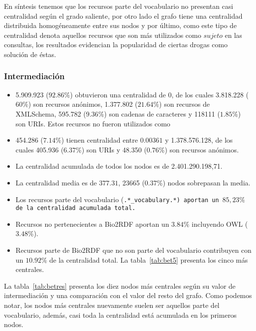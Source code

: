 En síntesis tenemos que los recursos parte del vocabulario no presentan casi
centralidad según el grado saliente, por otro lado el grafo tiene una
centralidad distribuida homogéneamente entre sus nodos y por último, como este
tipo de centralidad denota aquellos recursos que son más utilizados como
$sujeto$ en las consultas, los resultados evidencian la popularidad de ciertas
drogas como solución de éstas.

\subsubsection{Intermediación}
\begin{itemize}
  \item 5.909.923 ($92.86\%$) obtuvieron una centralidad de 0, de los cuales
      3.818.228 ($60\%$) son recursos anónimos,
      1.377.802 ($21.64\%$) son recursos de XMLSchema,
      595.782 ($9.36\%$) son cadenas de caracteres y
      118111 ($1.85\%$) son URIs.
      Estos recursos no fueron utilizados como 
  \item
    454.286 ($7.14\%$) tienen centralidad entre $0.00361$ y 1.378.576.128, de
    los cuales 405.936 ($6.37\%$) son URIs y
    48.350 ($0.76\%$) son recursos anónimos.
  \item La centralidad acumulada de todos los nodos es de 2.401.290.198,71.
  \item
    La centralidad media es de $377.31$, 23665 ($0.37\%$) nodos sobrepasan
    la media.
  \item 
    Los recursos parte del vocabulario (\tt{.*\_vocabulary.*}) aportan un 
    $85,23\%$ de la centralidad acumulada total.
  \item
    Recursos no pertenecientes a Bio2RDF aportan un $3.84\%$ incluyendo OWL 
    ($3.48\%$).
  \item 
    Recursos parte de Bio2RDF que no son parte del vocabulario contribuyen con
    un $10.92\%$ de la centralidad total. La tabla~\ref{tab:bet5} presenta los
    cinco más centrales.
\end{itemize}

La tabla~\ref{tab:betres} presenta los diez nodos más centrales según su valor
de intermediación y una comparación con el valor del resto del grafo.
Como podemos notar, los nodos más centrales nuevamente suelen ser aquellos parte
del vocabulario, además, casi toda la centralidad está acumulada en los primeros
nodos.

